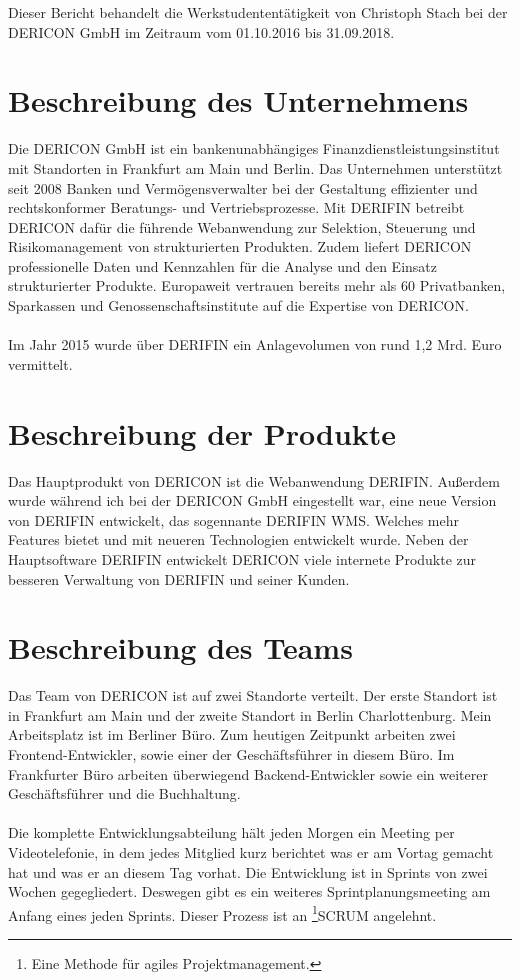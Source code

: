 \documentclass[chapterprefix=false, 12pt, a4paper, oneside, parskip=half, listof=totoc, bibliography=totoc, numbers=noendperiod]{scrbook}
\begin{document}
    Dieser Bericht behandelt die Werkstudententätigkeit von Christoph Stach bei der DERICON GmbH im Zeitraum vom 01.10.2016 bis 31.09.2018.

    \section{Beschreibung des Unternehmens}

    Die DERICON GmbH ist ein bankenunabhängiges Finanzdienstleistungsinstitut mit Standorten in Frankfurt am Main und Berlin.
    Das Unternehmen unterstützt seit 2008 Banken und Vermögensverwalter bei der Gestaltung effizienter und rechtskonformer Beratungs- und Vertriebsprozesse.
    Mit DERIFIN betreibt DERICON dafür die führende Webanwendung zur Selektion, Steuerung und Risikomanagement von strukturierten Produkten.
    Zudem liefert DERICON professionelle Daten und Kennzahlen für die Analyse und den Einsatz strukturierter Produkte.
    Europaweit vertrauen bereits mehr als 60 Privatbanken, Sparkassen und Genossenschaftsinstitute auf die Expertise von DERICON.
    \\ \\
    Im Jahr 2015 wurde über DERIFIN ein Anlagevolumen von rund 1,2 Mrd. Euro vermittelt.

    \section{Beschreibung der Produkte}

    Das Hauptprodukt von DERICON ist die Webanwendung DERIFIN. Außerdem wurde während ich bei der DERICON GmbH eingestellt war,
    eine neue Version von DERIFIN entwickelt, das sogennante DERIFIN WMS. Welches mehr Features bietet und mit neueren Technologien entwickelt wurde.
    Neben der Hauptsoftware DERIFIN entwickelt DERICON viele internete Produkte zur besseren Verwaltung von DERIFIN und seiner Kunden.

    \section{Beschreibung des Teams}

    Das Team von DERICON ist auf zwei Standorte verteilt. Der erste Standort ist in Frankfurt am Main und der zweite Standort in Berlin Charlottenburg.
    Mein Arbeitsplatz ist im Berliner Büro. Zum heutigen Zeitpunkt arbeiten zwei Frontend-Entwickler, sowie einer der Geschäftsführer in diesem Büro.
    Im Frankfurter Büro arbeiten überwiegend Backend-Entwickler sowie ein weiterer Geschäftsführer und die Buchhaltung.
    \\ \\
    Die komplette Entwicklungsabteilung hält jeden Morgen ein Meeting per Videotelefonie, in dem jedes Mitglied kurz berichtet
    was er am Vortag gemacht hat und was er an diesem Tag vorhat.
    Die Entwicklung ist in Sprints von zwei Wochen gegegliedert. Deswegen gibt es ein weiteres Sprintplanungsmeeting am Anfang eines jeden Sprints.
    Dieser Prozess ist an \footnote{Eine Methode für agiles Projektmanagement.}SCRUM angelehnt.
\end{document}
